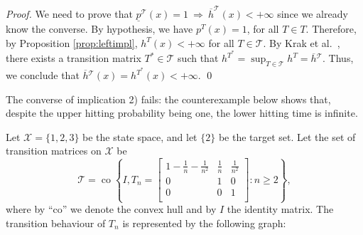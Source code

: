 \documentclass{svproc}
\newcommand{\T}{\mathcal{T}}
\newcommand{\ulp}{\underline{p}}
\newcommand{\olh}{\overline{h}}
\newcommand{\X}{\mathcal{X}}
\newcommand{\ch}{\operatorname{co}}
\begin{document}
\begin{proof}
    We need to prove that $\ulp^\T(x)=1 \ \Rightarrow \ \olh^\T(x)<+\infty$ since we already know the converse.
    By hypothesis, we have $p^T(x)=1$, for all $T\in T$. Therefore, by Proposition \ref{prop:leftimpl}, $h^T(x)<+\infty$ for all $T\in \T$. By Krak et al.~\cite[Theorem 12]{krak2019hitting}, there exists a transition matrix $T^*\in \T$ such that $h^{T^*}=\sup_{T\in \T} h^T=\olh{^\T}$. Thus, we conclude that $\olh{^\T}(x)=h^{T^*}(x)<+\infty$. \qed
\end{proof}
The converse of implication 2) fails: the counterexample below shows that, despite the upper hitting probability being one, the lower hitting time is infinite.
\begin{example}\label{ex:unosun}
Let $\X=\{1,2,3\}$ be the state space, and let $\{2\}$ be the target set. Let the set of transition matrices on $\X$ be
    \begin{equation*}
        \T=\ch\left\{I, T_n=
        \begin{bmatrix}
            1-\frac{1}{n}-\frac{1}{n^2} & \frac{1}{n} & \frac{1}{n^2}\\
            0 & 1 & 0\\
            0 & 0 & 1\\
        \end{bmatrix}
        : n\ge 2
        \right\},
    \end{equation*}
    where by ``co'' we denote the convex hull and by $I$ the identity matrix. 
    The transition behaviour of $T_n$ is represented by the following graph:
    \begin{center}
\end{center}
\end{example}
\end{document}
